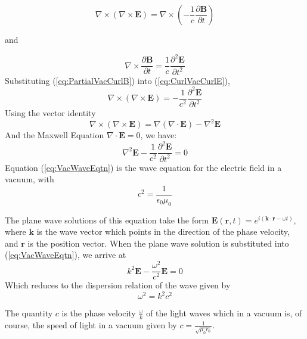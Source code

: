 \documentclass[twocolumn]{article}
\begin{document}
\begin{equation}
	\label{eq:CurlVacCurlE}
	\nabla \times ( \nabla \times \mathbf{E}) = \nabla \times (-\frac{1}{c} \frac{\partial \mathbf{B}}{\partial t}) 
\end{equation}
\begin{center}
	and
\end{center}
\begin{equation}
	\label{eq:PartialVacCurlB}
	\nabla \times \frac{\partial \mathbf{B}}{\partial t} = \frac{1}{c} \frac{\partial^2 \mathbf{E}}{\partial t^2}
\end{equation}
Substituting (\ref{eq:PartialVacCurlB}) into (\ref{eq:CurlVacCurlE}),
\begin{equation}
	\nabla \times ( \nabla \times \mathbf{E}) = -\frac{1}{c^2} \frac{\partial^2 \mathbf{E}}{\partial t^2} 
\end{equation}
Using the vector identity
\begin{equation}
	\label{eq:NablaIdent}
	\nabla \times (\nabla \times \mathbf{E}) = \nabla(\nabla \cdot \mathbf{E}) - \nabla^2\mathbf{E}
\end{equation}
And the Maxwell Equation $\nabla \cdot \mathbf{E} = 0$, we have:
\begin{equation}
	\label{eq:VacWaveEqtn}
	\nabla^2\mathbf{E} - \frac{1}{c^2} \frac{\partial^2 \mathbf{E}}{\partial t^2} = 0
\end{equation}
Equation (\ref{eq:VacWaveEqtn}) is the wave equation for the electric field in a vacuum, with
\begin{equation}
	c^2 = \frac{1}{\epsilon_0 \mu_0}
\end{equation}

The plane wave solutions of this equation take the form $\mathbf{E}(\mathbf{r}, t) = e^{i(\mathbf{k} \cdot \mathbf{r} - \omega t)}$, where $\mathbf{k}$ is the wave vector which points in the direction of the phase velocity, and $\mathbf{r}$ is the position vector.
When the plane wave solution is substituted into (\ref{eq:VacWaveEqtn}), we arrive at
\begin{equation}
	k^2\mathbf{E} - \frac{\omega^2}{c^2}\mathbf{E} = 0
\end{equation}
Which reduces to the dispersion relation of the wave given by
\begin{equation}
	\omega^2 = k^2c^2
\end{equation}

The quantity $c$ is the phase velocity $\frac{\omega}{k}$ of the light waves which in a vacuum is, of course, the speed of light in a vacuum given by $c = \frac{1}{\sqrt{\mu_0\epsilon_0}}$.
\end{document}
